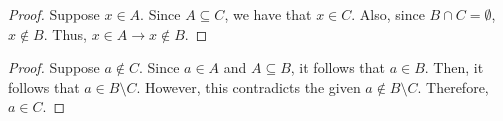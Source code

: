 \documentclass[12pt,letterpaper]{exam}
\begin{document}
\begin{questions}
    \question
    \begin{proof}
        Suppose $x \in A$. 
        Since $A \subseteq C$, we have that $x \in C$.
        Also, since $B \cap C = \emptyset$, $x \not\in B$.
        Thus, $x \in A \rightarrow x \not\in B$.
    \end{proof}

    \setcounter{question}{5}

    \question
    \begin{proof}
        Suppose $a \not\in C$.
        Since $a \in A$ and $A \subseteq B$, it follows that $a \in B$.
        Then, it follows that $a \in B \setminus C$.
        However, this contradicts the given $a \not\in B \setminus C$.
        Therefore, $a \in C$.
    \end{proof}

\end{questions}
\end{document}
